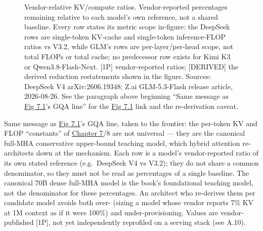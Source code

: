 \begin{figure}
\centering
{}
\caption[Vendor-relative KV/compute ratios]{Vendor-relative KV/compute ratios. Vendor-reported percentages remaining relative to each model's own reference, not a shared baseline. Every row states its metric scope in-figure: the DeepSeek rows are single-token KV-cache and single-token inference-FLOP ratios vs V3.2, while GLM's rows are per-layer/per-head scope, not total FLOPs or total cache; no predecessor row exists for Kimi K3 or Qwen3.8-Flash-Next. \mbox{{[}1P{]}} vendor-reported ratios; \mbox{{[}DERIVED{]}} the derived reduction restatements shown in the figure. Sources: DeepSeek V4 arXiv:2606.19348; Z.ai GLM-5.3-Flash release article, 2026-08-26. See the paragraph above beginning ``Same message as \hyperref[fig:7.1]{Fig 7.1}'s GQA line'' for the \hyperref[fig:7.1]{Fig 7.1} link and the re-derivation caveat.}
\end{figure}

Same message as \hyperref[fig:7.1]{Fig 7.1}'s GQA line, taken to the frontier: the per-token
KV and FLOP ``constants'' of \hyperref[chap:7]{Chapter 7}/8 are not universal --- they are
the canonical full-MHA conservative upper-bound teaching model, which
hybrid attention re-architects down at the mechanism. Each row is a
model's vendor-reported ratio of its own stated reference (e.g.~DeepSeek
V4 vs V3.2); they do not share a common denominator, so they must not be
read as percentages of a single baseline. The canonical 70B dense
full-MHA model is the book's foundational teaching model, not the
denominator for these percentages. An architect who re-derives them per
candidate model avoids both over- (sizing a model whose vendor reports
7\% KV at 1M context as if it were 100\%) and under-provisioning. Values
are vendor-published \mbox{{[}1P{]}}, not yet independently reprofiled on a
serving stack (see A.10).

